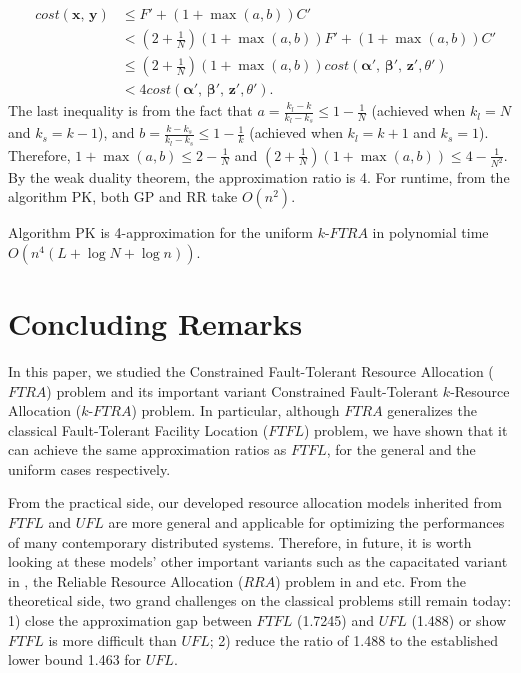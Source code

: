 \documentclass[10pt]{llncs}
\begin{document}
\begin{eqnarray*}
 & cost\left(\boldsymbol{x},\,\boldsymbol{y}\right) & \leq F'+\left(1+\max\left(a,b\right)\right)C'\\
 &  & <\left(2+\frac{1}{N}\right)\left(1+\max\left(a,b\right)\right)F'+\left(1+\max\left(a,b\right)\right)C'\\
 &  & \leq\left(2+\frac{1}{N}\right)\left(1+\max\left(a,b\right)\right)cost\left(\boldsymbol{\alpha'},\,\boldsymbol{\beta'},\,\boldsymbol{z'},\theta'\right)\\
 &  & <4cost\left(\boldsymbol{\alpha'},\,\boldsymbol{\beta'},\,\boldsymbol{z'},\theta'\right).
\end{eqnarray*}
The last inequality is from the fact that $a=\frac{k_{l}-k}{k_{l}-k_{s}}\leq1-\frac{1}{N}$
(achieved when $k_{l}=N$ and $k_{s}=k-1$), and $b=\frac{k-k_{s}}{k_{l}-k_{s}}\leq1-\frac{1}{k}$
(achieved when $k_{l}=k+1$ and $k_{s}=1$). Therefore, $1+\max\left(a,b\right)\leq2-\frac{1}{N}$
and $\left(2+\frac{1}{N}\right)\left(1+\max\left(a,b\right)\right)\leq4-\frac{1}{N^{2}}$.
By the weak duality theorem, the approximation ratio is 4. For runtime,
from the algorithm PK, both GP and RR take $O\left(n^{2}\right)$. 
\begin{theorem}
Algorithm PK is 4-approximation for the uniform $k$-$FTRA$ in polynomial
time $O\left(n^{4}\left(L+\log N+\log n\right)\right)$.
\end{theorem}

\section{Concluding Remarks}

In this paper, we studied the Constrained Fault-Tolerant Resource
Allocation ($FTRA$) problem and its important variant Constrained
Fault-Tolerant $k$-Resource Allocation ($k$-$FTRA$) problem. In
particular, although $FTRA$ generalizes the classical Fault-Tolerant
Facility Location ($FTFL$) problem, we have shown that it can achieve
the same approximation ratios as $FTFL$, for the general and the
uniform cases respectively. 

From the practical side, our developed resource allocation models
inherited from $FTFL$ and $UFL$ are more general and applicable
for optimizing the performances of many contemporary distributed systems.
Therefore, in future, it is worth looking at these models' other important
variants such as the capacitated variant in \cite{kewen2011cocoon},
the Reliable Resource Allocation ($RRA$) problem in \cite{kewen2012cats}
and etc. From the theoretical side, two grand challenges on the classical
problems still remain today: 1) close the approximation gap between
$FTFL$ (1.7245) and $UFL$ (1.488) or show $FTFL$ is more difficult
than $UFL$; 2) reduce the ratio of 1.488 to the established lower
bound 1.463 for $UFL$.
\end{document}
